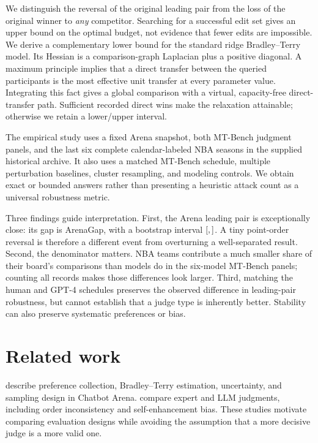\documentclass{article}
\newcommand{\num}[1]{\csname #1\endcsname}
\begin{document}
We distinguish the reversal of the original leading pair from the loss of the original winner to \emph{any} competitor. Searching for a successful edit set gives an upper bound on the optimal budget, not evidence that fewer edits are impossible. We derive a complementary lower bound for the standard ridge Bradley--Terry model. Its Hessian is a comparison-graph Laplacian plus a positive diagonal. A maximum principle implies that a direct transfer between the queried participants is the most effective unit transfer at every parameter value. Integrating this fact gives a global comparison with a virtual, capacity-free direct-transfer path. Sufficient recorded direct wins make the relaxation attainable; otherwise we retain a lower/upper interval.

The empirical study uses a fixed Arena snapshot, both MT-Bench judgment panels, and the last six complete calendar-labeled NBA seasons in the supplied historical archive. It also uses a matched MT-Bench schedule, multiple perturbation baselines, cluster resampling, and modeling controls. We obtain exact or bounded answers rather than presenting a heuristic attack count as a universal robustness metric.

Three findings guide interpretation. First, the Arena leading pair is exceptionally close: its gap is \num{ArenaGap}, with a bootstrap interval $[\num{ArenaGapLo},\num{ArenaGapHi}]$. A tiny point-order reversal is therefore a different event from overturning a well-separated result. Second, the denominator matters. NBA teams contribute a much smaller share of their board's comparisons than models do in the six-model MT-Bench panels; counting all records makes those differences look larger. Third, matching the human and GPT-4 schedules preserves the observed difference in leading-pair robustness, but cannot establish that a judge type is inherently better. Stability can also preserve systematic preferences or bias.

\section{Related work}
\citet{chiang2024arena} describe preference collection, Bradley--Terry estimation, uncertainty, and sampling design in Chatbot Arena. \citet{zheng2023judge} compare expert and LLM judgments, including order inconsistency and self-enhancement bias. These studies motivate comparing evaluation designs while avoiding the assumption that a more decisive judge is a more valid one.
\end{document}
